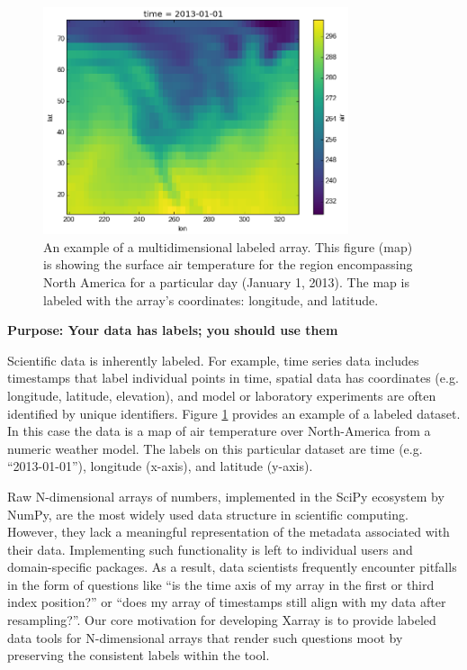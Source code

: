 \documentclass{jors}
\begin{document}
\begin{figure}[h]
	\centering
	\includegraphics[width=0.8\textwidth]{plotting_kelvin_original}
	\caption{An example of a multidimensional labeled array. This figure (map) is showing the surface air temperature for the region encompassing North America for a particular day (January 1, 2013). The map is labeled with the array's coordinates: longitude, and latitude.}
	\label{fig:temperature_map}
\end{figure}

\textbf{Purpose: Your data has labels; you should use them}

Scientific data is inherently labeled.
For example, time series data includes timestamps that label individual points in time, spatial data has coordinates (e.g. longitude, latitude, elevation), and model or laboratory experiments are often identified by unique identifiers.
Figure \ref{fig:temperature_map} provides an example of a labeled dataset.
In this case the data is a map of air temperature over North-America from a numeric weather model.
The labels on this particular dataset are time (e.g. ``2013-01-01''), longitude (x-axis), and latitude (y-axis).

Raw N-dimensional arrays of numbers, implemented in the SciPy ecosystem by NumPy, are the most widely used data structure in scientific computing.
However, they lack a meaningful representation of the metadata associated with their data.
Implementing such functionality is left to individual users and domain-specific packages.
As a result, data scientists frequently encounter pitfalls in the form of questions like ``is the time axis of my array in the first or third index position?'' or ``does my array of timestamps still align with my data after resampling?''.
Our core motivation for developing Xarray is to provide labeled data tools for N-dimensional arrays that render such questions moot by preserving the consistent labels within the tool.
\end{document}
